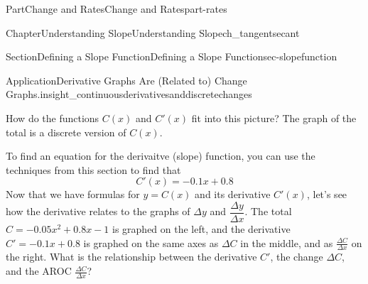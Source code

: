 \documentclass{tufte-book}
\numberwithin{equation}{chapter}
\def \tikzhistogram (#1,#2){\draw[fill=blue,opacity=0.3] ({#1+((\xtwo-\xmin)/5)},#2) rectangle ({#1-((\xtwo-\xmin)/5)},0); \draw[draw,thick] ({#1+((\xtwo-\xmin)/5)},#2) rectangle ({#1-((\xtwo-\xmin)/5)},0); \node[draw,fill=blue, circle,inner sep=2.5pt] at (#1,#2) {};}
\begin{document}
\begin{partptx}{Part}{Change and Rates}{}{Change and Rates}{}{}{part-rates}
\begin{chapterptx}{Chapter}{Understanding Slope}{}{Understanding Slope}{}{}{ch_tangentsecant}
\begin{sectionptx}{Section}{Defining a Slope Function}{}{Defining a Slope Function}{}{}{sec-slopefunction}
\begin{insight}{Application}{Derivative Graphs Are (Related to) Change Graphs.}{insight_continuousderivativesanddiscretechanges}
\begin{image}{0}{1}{0}{}
{
}%
\end{image}%
How do the functions \(C(x)\) and \(C'(x)\) fit into this picture? The graph of the total is a discrete version of \(C(x)\).%
\par
To find an equation for the derivaitve (slope) function, you can use the techniques from this section to find that%
\begin{equation*}
C'(x) = -0.1 x + 0.8
\end{equation*}
Now that we have formulas for \(y=C(x)\) and its derivative \(C'(x)\), let's see how the derivative relates to the graphs of \(\Delta y\) and \(\dfrac{\Delta y}{\Delta x}\). The total \(C = -0.05 x^2 + 0.8 x - 1\) is graphed on the left, and the derivative \(C' = -0.1 x + 0.8\) is graphed on the same axes as \(\Delta C\) in the middle, and as \(\frac{\Delta C}{\Delta x}\) on the right. What is the relationship between the derivative \(C'\), the change \(\Delta C\), and the AROC \(\frac{\Delta C}{\Delta x}\)?%
\begin{image}{0}{1}{0}{}%
\end{image}
\end{insight}
\end{sectionptx}
\end{chapterptx}
\end{partptx}
\end{document}
